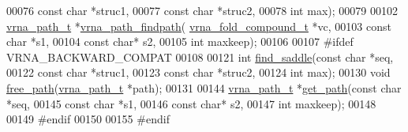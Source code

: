 \begin{DoxyCode}
00076                               \textcolor{keyword}{const} \textcolor{keywordtype}{char} *struc1,
00077                               \textcolor{keyword}{const} \textcolor{keywordtype}{char} *struc2,
00078                               \textcolor{keywordtype}{int} max);
00079 
00102 \hyperlink{group__direct__paths_structvrna__path__s}{vrna\_path\_t} *\hyperlink{group__direct__paths_ga5e1f97f58adc65016a8df88802dc16b5}{vrna\_path\_findpath}(
      \hyperlink{group__fold__compound_structvrna__fc__s}{vrna\_fold\_compound\_t} *vc,
00103                                 \textcolor{keyword}{const} \textcolor{keywordtype}{char} *s1,
00104                                 \textcolor{keyword}{const} \textcolor{keywordtype}{char}* s2,
00105                                 \textcolor{keywordtype}{int} maxkeep);
00106 
00107 \textcolor{preprocessor}{#ifdef VRNA\_BACKWARD\_COMPAT}
00108 
00121 \textcolor{keywordtype}{int} \hyperlink{group__direct__paths_gad0e14268e309af773ecd1fce6244ee50}{find\_saddle}(\textcolor{keyword}{const} \textcolor{keywordtype}{char} *seq,
00122                 \textcolor{keyword}{const} \textcolor{keywordtype}{char} *struc1,
00123                 \textcolor{keyword}{const} \textcolor{keywordtype}{char} *struc2,
00124                 \textcolor{keywordtype}{int} max);
00130 \textcolor{keywordtype}{void}    \hyperlink{group__direct__paths_ga9056421d716ae89f0ed3f107627f395b}{free\_path}(\hyperlink{group__direct__paths_structvrna__path__s}{vrna\_path\_t} *path);
00131 
00144 \hyperlink{group__direct__paths_structvrna__path__s}{vrna\_path\_t} *\hyperlink{group__direct__paths_ga0b22426253e190bd268f86b01b71220d}{get\_path}(\textcolor{keyword}{const} \textcolor{keywordtype}{char} *seq,
00145                       \textcolor{keyword}{const} \textcolor{keywordtype}{char} *s1,
00146                       \textcolor{keyword}{const} \textcolor{keywordtype}{char}* s2,
00147                       \textcolor{keywordtype}{int} maxkeep);
00148 
00149 \textcolor{preprocessor}{#endif}
00150 
00155 \textcolor{preprocessor}{#endif}
\end{DoxyCode}
